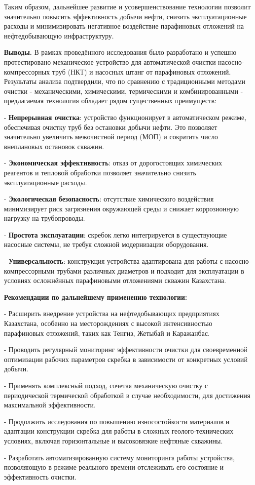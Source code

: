 \begin{multicols}{2}
Таким образом, дальнейшее развитие и усовершенствование технологии
позволит значительно повысить эффективность добычи нефти, снизить
эксплуатационные расходы и минимизировать негативное воздействие
парафиновых отложений на нефтедобывающую инфраструктуру.

{\bfseries Выводы.} В рамках проведённого исследования было разработано и
успешно протестировано механическое устройство для автоматической
очистки насосно-компрессорных труб (НКТ) и насосных штанг от парафиновых
отложений. Результаты анализа подтвердили, что по сравнению с
традиционными методами очистки - механическими, химическими,
термическими и комбинированными - предлагаемая технология обладает рядом
существенных преимуществ:

- {\bfseries Непрерывная очистка}: устройство функционирует в
автоматическом режиме, обеспечивая очистку труб без остановки добычи
нефти. Это позволяет значительно увеличить межочистной период (МОП) и
сократить число внеплановых остановок скважин.

- {\bfseries Экономическая эффективность}: отказ от дорогостоящих
химических реагентов и тепловой обработки позволяет значительно
снизить эксплуатационные расходы.

- {\bfseries Экологическая безопасность}: отсутствие химического
воздействия минимизирует риск загрязнения окружающей среды и снижает
коррозионную нагрузку на трубопроводы.

- {\bfseries Простота эксплуатации}: скребок легко интегрируется в
существующие насосные системы, не требуя сложной модернизации
оборудования.

- {\bfseries Универсальность}: конструкция устройства адаптирована для
работы с насосно-компрессорными трубами различных диаметров и подходит
для эксплуатации в условиях осложнённых парафиновыми отложениями
скважин Казахстана.

{\bfseries Рекомендации по дальнейшему применению технологии:}

- Расширить внедрение устройства на нефтедобывающих предприятиях
Казахстана, особенно на месторождениях с высокой интенсивностью
парафиновых отложений, таких как Тенгиз, Жетыбай и Каражанбас.

- Проводить регулярный мониторинг эффективности очистки для
своевременной оптимизации рабочих параметров скребка в зависимости от
конкретных условий добычи.

- Применять комплексный подход, сочетая механическую очистку с
периодической термической обработкой в случае необходимости, для
достижения максимальной эффективности.

- Продолжить исследования по повышению износостойкости материалов и
адаптации конструкции скребка для работы в сложных геолого-технических
условиях, включая горизонтальные и высоковязкие нефтяные скважины.

- Разработать автоматизированную систему мониторинга работы устройства,
позволяющую в режиме реального времени отслеживать его состояние и
эффективность очистки.
\end{multicols}

